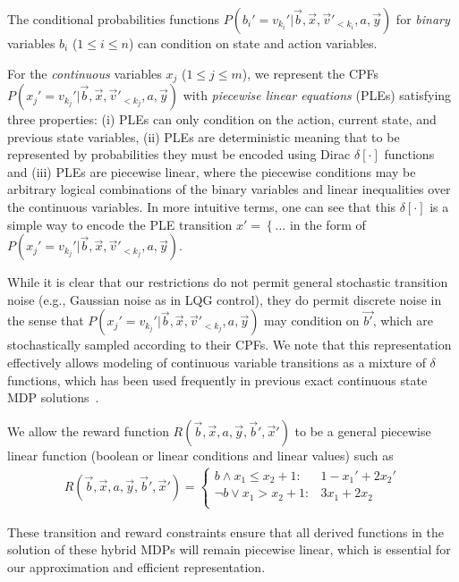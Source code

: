The conditional probabilities functions $P(b_i'=v_{k_i}'|\vec{b},\vec{x},\vec{v}'_{<{k_i}},a,\vec{y})$ for \emph{binary} variables $b_i$ ($1 \leq i \leq n$) can condition on state and action variables.  

For the \emph{continuous} variables $x_j$ ($1 \leq j \leq m$), we represent the CPFs $P(x_j'=v_{k_j}'|\vec{b},\vec{x},\vec{v}'_{<{k_j}},a,\vec{y})$ with \emph{piecewise
linear equations} (PLEs) satisfying three properties: (i) PLEs 
can only condition on the action, current state, and previous state variables, (ii) PLEs are
deterministic meaning that to be represented by probabilities they
must be encoded using Dirac $\delta[\cdot]$ functions and (iii) PLEs are piecewise linear, where the piecewise conditions may be arbitrary logical combinations of the binary variables
and linear inequalities over the continuous variables. In more intuitive
terms, one can see that this $\delta[\cdot]$ is a simple way to encode
the PLE transition $x' = \left\{ \ldots \right.$ in the form of 
$P(x_j'=v_{k_j}'|\vec{b},\vec{x},\vec{v}'_{<{k_j}},a,\vec{y})$.

While it is clear that our restrictions do not permit general stochastic transition
noise (e.g., Gaussian noise as in LQG control), they do permit
discrete noise in the sense that $P(x_j'=v_{k_j}'|\vec{b},\vec{x},\vec{v}'_{<{k_j}},a,\vec{y})$ may condition on $\vec{b'}$, which are stochastically sampled according to their CPFs.
We note that this representation effectively allows modeling of
continuous variable transitions as a mixture of $\delta$ functions,
which has been used frequently in previous exact continuous state MDP
solutions~\cite{feng04,hao09}.


We allow the reward function $R(\vec{b},\vec{x},a,\vec{y},\vec{b}',\vec{x}')$ to be
a general piecewise linear function (boolean or linear conditions
and linear values) such as
\begin{align}
R(\vec{b},\vec{x},a,\vec{y},\vec{b}',\vec{x}') = \begin{cases}
b \land x_1 \leq x_2 + 1 : & 1 - x_1' + 2x_2' \\
\neg b \lor x_1 > x_2 + 1:     & 3x_1 + 2x_2 \\
\end{cases} \label{eq:linear_reward}
\end{align}

These transition and reward constraints ensure that all derived
functions in the solution of these hybrid MDPs will remain piecewise linear, which 
is essential for our approximation and efficient representation.

